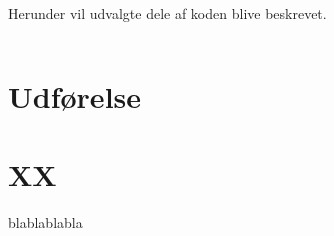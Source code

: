 \documentclass{article}
\begin{document}

Herunder vil udvalgte dele af koden blive beskrevet.


\begin{lstlisting}

\end{lstlisting}  



\newpage
\section{Udførelse}




\newpage
\section{XX}

blablablabla
\end{document}
